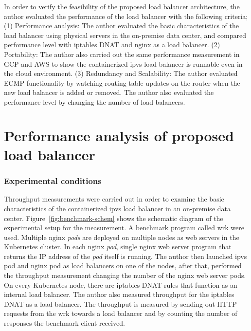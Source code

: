 
In order to verify the feasibility of the proposed load balancer architecture, the author evaluated the performance of the load balancer with the following criteria;
(1) Performance analysis:
The author evaluated the basic characteristics of the load balancer using physical servers in the on-premise data center, and compared performance level with iptables DNAT and nginx as a load balancer.
(2) Portability:
The author also carried out the same performance measurement in GCP and AWS to show the containerized ipvs load balancer is runnable even in the cloud environment.
(3) Redundancy and Scalability:
The author evaluated ECMP functionality by watching routing table updates on the router when the new load balancer is added or removed.
The author also evaluated the performance level by changing the number of load balancers.

\section{Performance analysis of proposed load balancer}

\subsubsection{Experimental conditions}

Throughput measurements were carried out in order to examine the basic characteristics of the containerized ipvs load balancer in an on-premise data center.
Figure~\ref{fig:benchmark-schem} shows the schematic diagram of the experimental setup for the measurement.
A benchmark program called wrk\cite{Glozer2016} were used.
Multiple nginx {\em pods} are deployed on multiple nodes as web servers in the Kubernetes cluster.
In each nginx {\em pod}, single nginx web server program that returns the IP address of the {\em pod} itself is running.
The author then launched ipvs pod and nginx pod as load balancers on one of the nodes, after that, performed the throughput measurement changing the number of the nginx web server pods.
On every Kubernetes node, there are iptables DNAT rules that function as an internal load balancer.
The author also measured throughput for the iptables DNAT as a load balancer.
The throughput is measured by sending out HTTP requests from the wrk towards a load balancer and by counting the number of responses the benchmark client received.

